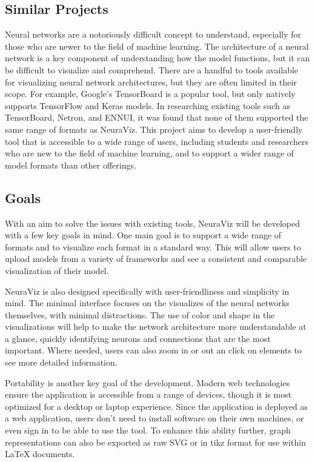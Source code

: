 \subsection{Similar Projects}
Neural networks are a notoriously difficult concept to understand, especially for those who are newer to the field of machine learning. The architecture of a neural network is a key component of understanding how the model functions, but it can be difficult to visualize and comprehend. There are a handful to tools available for visualizing neural network architectures, but they are often limited in their scope. For example, Google's TensorBoard is a popular tool, but only natively supports TensorFlow and Keras models. In researching existing tools such as TensorBoard, Netron, and ENNUI, it was found that none of them supported the same range of formats as NeuraViz. This project aims to develop a user-friendly tool that is accessible to a wide range of users, including students and researchers who are new to the field of machine learning, and to support a wider range of model formats than other offerings.

\subsection{Goals}
With an aim to solve the issues with existing tools, NeuraViz will be developed with a few key goals in mind. One main goal is to support a wide range of formats and to visualize each format in a standard way. This will allow users to upload models from a variety of frameworks and see a consistent and comparable visualization of their model.

NeuraViz is also designed specifically with user-friendliness and simplicity in mind. The minimal interface focuses on the visualizes of the neural networks themselves, with minimal distractions. The use of color and shape in the visualizations will help to make the network architecture more understandable at a glance, quickly identifying neurons and connections that are the most important. Where needed, users can also zoom in or out an click on elements to see more detailed information.

Portability is another key goal of the development. Modern web technologies ensure the application is accessible from a range of devices, though it is most optimized for a desktop or laptop experience. Since the application is deployed as a web application, users don't need to install software on their own machines, or even sign in to be able to use the tool. To enhance this ability further, graph representations can also be exported as raw SVG or in tikz format for use within LaTeX documents. 

